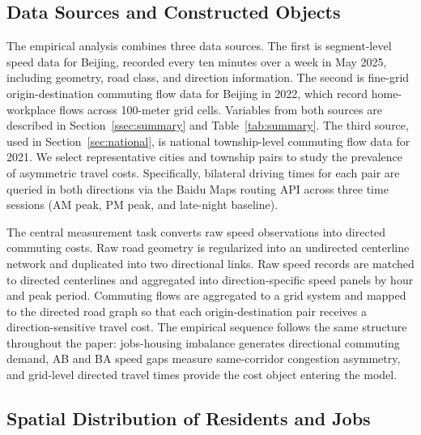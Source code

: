 \documentclass[12pt]{article}
\begin{document}
\subsection{Data Sources and Constructed Objects}

The empirical analysis combines three data sources. The first is segment-level speed data for Beijing, recorded every ten minutes over a week in May 2025, including geometry, road class, and direction information. The second is fine-grid origin-destination commuting flow data for Beijing in 2022, which record home-workplace flows across 100-meter grid cells. Variables from both sources are described in Section~\ref{ssec:summary} and Table~\ref{tab:summary}. The third source, used in Section~\ref{sec:national}, is national township-level commuting flow data for 2021. We select representative cities and township pairs to study the prevalence of asymmetric travel costs. Specifically, bilateral driving times for each pair are queried in both directions via the Baidu Maps routing API across three time sessions (AM peak, PM peak, and late-night baseline).

The central measurement task converts raw speed observations into directed commuting costs. Raw road geometry is regularized into an undirected centerline network and duplicated into two directional links. Raw speed records are matched to directed centerlines and aggregated into direction-specific speed panels by hour and peak period. Commuting flows are aggregated to a grid system and mapped to the directed road graph so that each origin-destination pair receives a direction-sensitive travel cost. The empirical sequence follows the same structure throughout the paper: jobs-housing imbalance generates directional commuting demand, AB and BA speed gaps measure same-corridor congestion asymmetry, and grid-level directed travel times provide the cost object entering the model.


\subsection{Spatial Distribution of Residents and Jobs}
\end{document}
